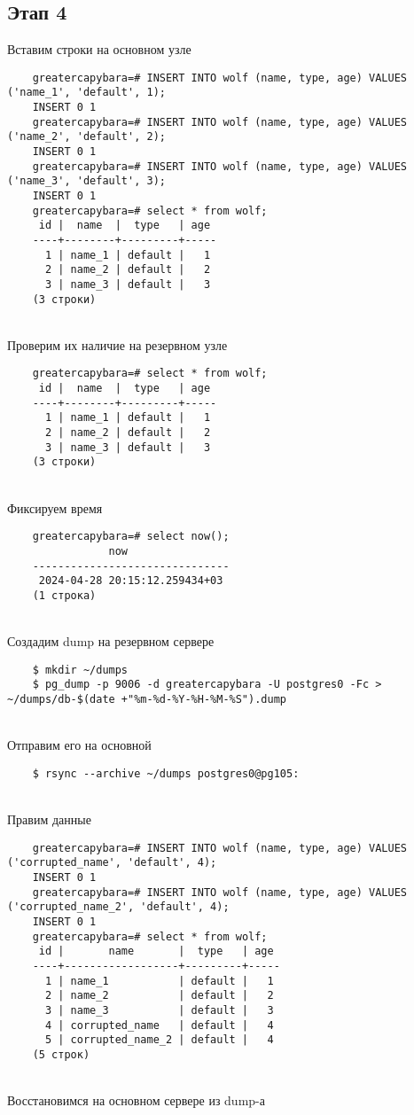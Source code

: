\documentclass{article}
\begin{document}
\subsection{Этап 4}

Вставим строки на основном узле

\begin{verbatim}
    greatercapybara=# INSERT INTO wolf (name, type, age) VALUES ('name_1', 'default', 1);
    INSERT 0 1
    greatercapybara=# INSERT INTO wolf (name, type, age) VALUES ('name_2', 'default', 2);
    INSERT 0 1
    greatercapybara=# INSERT INTO wolf (name, type, age) VALUES ('name_3', 'default', 3);
    INSERT 0 1
    greatercapybara=# select * from wolf;
     id |  name  |  type   | age
    ----+--------+---------+-----
      1 | name_1 | default |   1
      2 | name_2 | default |   2
      3 | name_3 | default |   3
    (3 строки)
\end{verbatim} \\
Проверим их наличие на резервном узле

\begin{verbatim}
    greatercapybara=# select * from wolf;
     id |  name  |  type   | age
    ----+--------+---------+-----
      1 | name_1 | default |   1
      2 | name_2 | default |   2
      3 | name_3 | default |   3
    (3 строки)
\end{verbatim} \\
Фиксируем время

\begin{verbatim}
    greatercapybara=# select now();
                now
    -------------------------------
     2024-04-28 20:15:12.259434+03
    (1 строка)
\end{verbatim} \\
Создадим dump на резервном сервере

\begin{verbatim}
    $ mkdir ~/dumps
    $ pg_dump -p 9006 -d greatercapybara -U postgres0 -Fc > ~/dumps/db-$(date +"%m-%d-%Y-%H-%M-%S").dump
\end{verbatim} \\
Отправим его на основной

\begin{verbatim}
    $ rsync --archive ~/dumps postgres0@pg105:
\end{verbatim} \\
Правим данные

\begin{verbatim}
    greatercapybara=# INSERT INTO wolf (name, type, age) VALUES ('corrupted_name', 'default', 4);
    INSERT 0 1
    greatercapybara=# INSERT INTO wolf (name, type, age) VALUES ('corrupted_name_2', 'default', 4);
    INSERT 0 1
    greatercapybara=# select * from wolf;
     id |       name       |  type   | age
    ----+------------------+---------+-----
      1 | name_1           | default |   1
      2 | name_2           | default |   2
      3 | name_3           | default |   3
      4 | corrupted_name   | default |   4
      5 | corrupted_name_2 | default |   4
    (5 строк)
\end{verbatim} \\
Восстановимся на основном сервере из dump-а
\end{document}
